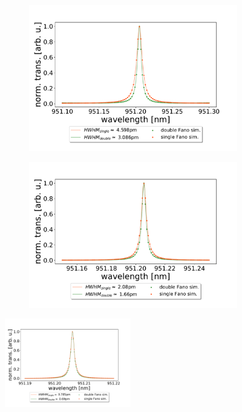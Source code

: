 \begin{figure}[h!]
\begin{subfigure}[b]{0.49\textwidth}
    \end{subfigure}
    \begin{subfigure}[b]{0.49\textwidth}
        \includegraphics[width=\textwidth]{figures/sim_single_vs_double_90um.pdf}
        \caption{}
        \label{fig:single_vs_double_simulation_90um}
    \end{subfigure}
    \begin{subfigure}[b]{0.49\textwidth}
        \includegraphics[width=\textwidth]{figures/sim_single_vs_double_270um.pdf}
        \caption{}
        \label{fig:single_vs_double_simulation_270um}
    \end{subfigure}
    \includegraphics[width=0.49\textwidth]{figures/sim_single_vs_double_810um.pdf}
    \caption{}
    \label{fig:single_vs_double_simulation_810um}
\end{figure}

